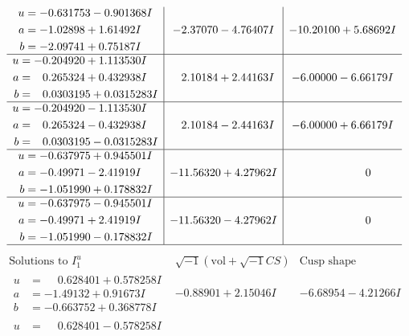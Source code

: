 \documentclass[1p]{elsarticle_modified}
\theoremstyle{definition}
\newcommand{\I}{\sqrt{-1}}
\begin{document}
$$\begin{array}{c|c|c}
\begin{aligned}
u &= -0.631753 - 0.901368 I \\
a &= -1.02898 + 1.61492 I \\
b &= -2.09741 + 0.75187 I\end{aligned}
 & -2.37070 - 4.76407 I & -10.20100 + 5.68692 I \\ \hline\begin{aligned}
u &= -0.204920 + 1.113530 I \\
a &= \phantom{-}0.265324 + 0.432938 I \\
b &= \phantom{-}0.0303195 + 0.0315283 I\end{aligned}
 & \phantom{-}2.10184 + 2.44163 I & -6.00000 - 6.66179 I \\ \hline\begin{aligned}
u &= -0.204920 - 1.113530 I \\
a &= \phantom{-}0.265324 - 0.432938 I \\
b &= \phantom{-}0.0303195 - 0.0315283 I\end{aligned}
 & \phantom{-}2.10184 - 2.44163 I & -6.00000 + 6.66179 I \\ \hline\begin{aligned}
u &= -0.637975 + 0.945501 I \\
a &= -0.49971 - 2.41919 I \\
b &= -1.051990 + 0.178832 I\end{aligned}
 & -11.56320 + 4.27962 I & \phantom{-0.000000 } 0 \\ \hline\begin{aligned}
u &= -0.637975 - 0.945501 I \\
a &= -0.49971 + 2.41919 I \\
b &= -1.051990 - 0.178832 I\end{aligned}
 & -11.56320 - 4.27962 I & \phantom{-0.000000 } 0\\
 \hline 
 \end{array}$$\newpage$$\begin{array}{c|c|c}  
\text{Solutions to }I^u_{1}& \I (\text{vol} + \sqrt{-1}CS) & \text{Cusp shape}\\
 \hline 
\begin{aligned}
u &= \phantom{-}0.628401 + 0.578258 I \\
a &= -1.49132 + 0.91673 I \\
b &= -0.663752 + 0.368778 I\end{aligned}
 & -0.88901 + 2.15046 I & -6.68954 - 4.21266 I \\ \hline\begin{aligned}
u &= \phantom{-}0.628401 - 0.578258 I \\

\end{aligned}
\end{array}$$
\end{document}
